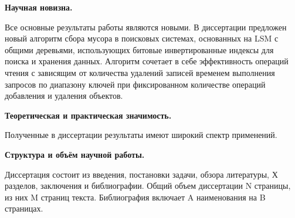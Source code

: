 \textbf{Научная новизна.}

Все основные результаты работы являются новыми. В диссертации предложен новый
алгоритм сбора мусора в поисковых системах, основанных на  LSM с общими
деревьями, использующих битовые инвертированные индексы для поиска и хранения
данных. Алгоритм сочетает в себе эффективность операций чтения с зависящим от
количества удалений записей временем выполнения запросов по диапазону ключей
при фиксированном количестве операций добавления и удаления объектов.

\textbf{Теоретическая и практическая значимость.}

Полученные в диссертации результаты имеют широкий спектр применений.

\textbf{Структура и объём научной работы.}

Диссертация состоит из введения, постановки задачи, обзора литературы, Х
разделов, заключения и библиографии. Общий объем диссертации N страницы, из
них M страниц текста. Библиография включает A наименования на B страницах.